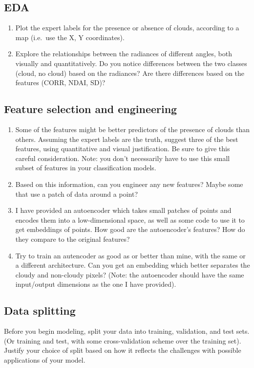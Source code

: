 \documentclass[letterpaper,12pt]{article}
\begin{document}
\subsection{EDA}
\begin{enumerate}
    \item Plot the expert labels for the presence or absence of clouds, according to a map (i.e.~use the X, Y coordinates).
    \item Explore the relationships between the radiances of different angles, both visually and quantitatively. Do you notice differences between the two classes (cloud, no cloud) based on the radiances? Are there differences based on the features (CORR, NDAI, SD)?
\end{enumerate}

\subsection{Feature selection and engineering}
\begin{enumerate}
    \item Some of the features might be better predictors of the presence of clouds than others. Assuming the expert labels are the truth, suggest three of the best features, using quantitative and visual justification. Be sure to give this careful consideration. Note: you don't necessarily have to use this small subset of features in your classification models.
    \item Based on this information, can you engineer any new features? Maybe some that use a patch of data around a point?
    \item I have provided an autoencoder which takes small patches of points and encodes them into a low-dimensional space, as well as some code to use it to get embeddings of points. How good are the autoencoder's features? How do they compare to the original features?
    \item Try to train an autencoder as good as or better than mine, with the same or a different architecture. Can you get an embedding which better separates the cloudy and non-cloudy pixels? (Note: the autoencoder should have the same input/output dimensions as the one I have provided).
\end{enumerate}

\subsection{Data splitting}
Before you begin modeling, split your data into training, validation, and test sets. (Or training and test, with some cross-validation scheme over the training set). Justify your choice of split based on how it reflects the challenges with possible applications of your model.
\end{document}
